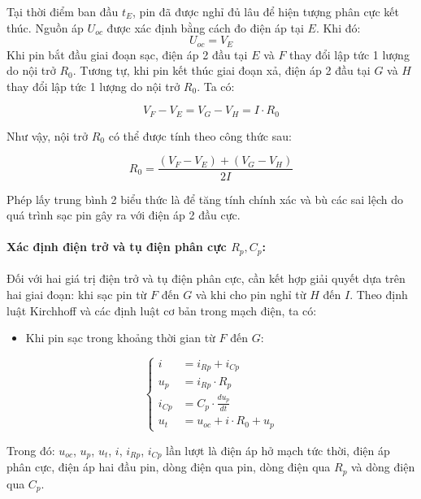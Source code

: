 \documentclass{thesis}
\begin{document}
Tại thời điểm ban đầu $t_E$, pin đã được nghỉ đủ lâu để hiện tượng phân cực kết thúc. Nguồn áp $U_{oc}$ được xác định bằng cách đo điện áp tại $E$. Khi đó:
\begin{equation}
U_{oc} = V_E 
\end{equation}
Khi pin bắt đầu giai đoạn sạc, điện áp 2 đầu tại $E$ và $F$ thay đổi lập tức 1 lượng do nội trở $R_0$. Tương tự, khi pin kết thúc giai đoạn xả, điện áp 2 đầu tại $G$ và $H$ thay đổi lập tức 1 lượng do nội trở $R_0$. Ta có:

\begin{equation}
V_F - V_E = V_G - V_H = I \cdot R_0 
\end{equation}

Như vậy, nội trở $R_0$ có thể được tính theo công thức sau:

\begin{equation}
R_0 = \frac{(V_F - V_E) + (V_G - V_H)}{2I} 
\end{equation}

Phép lấy trung bình 2 biểu thức là để tăng tính chính xác và bù các sai lệch do quá trình sạc pin gây ra với điện áp 2 đầu cực.

\paragraph{Xác định điện trở và tụ điện phân cực $R_p, C_p$:}\mbox{}


Đối với hai giá trị điện trở và tụ điện phân cực, cần kết hợp giải quyết dựa trên hai giai đoạn: khi sạc pin từ \( F \) đến \( G \) và khi cho pin nghỉ từ \( H \) đến \( I \). Theo định luật Kirchhoff và các định luật cơ bản trong mạch điện, ta có:

\begin{itemize}
    \item Khi pin sạc trong khoảng thời gian từ $F$ đến $G$:
\end{itemize}
\begin{equation}
\left\{
\begin{aligned}
i &= i_{Rp} + i_{Cp} \\
u_p &= i_{Rp} \cdot R_p \\
i_{Cp} &= C_p \cdot \frac{du_p}{dt} \\
u_t &= u_{oc} + i \cdot R_0 + u_p
\end{aligned}
\right.
\end{equation}

Trong đó: \( u_{oc} \), \( u_p \), \( u_t \), \( i \), \( i_{Rp} \), \( i_{Cp} \) lần lượt là điện áp hở mạch tức thời, điện áp phân cực, điện áp hai đầu pin, dòng điện qua pin, dòng điện qua \( R_p \) và dòng điện qua \( C_p \).
\end{document}
